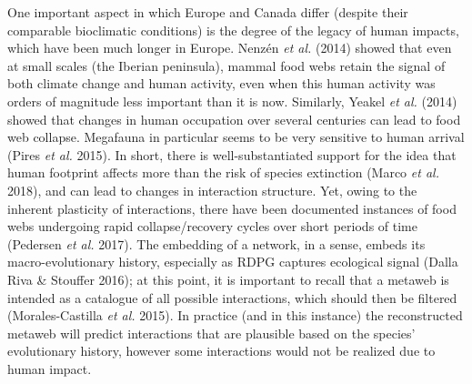 \documentclass[10pt,oneside]{article}
\begin{document}
One important aspect in which Europe and Canada differ (despite their
comparable bioclimatic conditions) is the degree of the legacy of human
impacts, which have been much longer in Europe. Nenzén \emph{et al.}
(2014) showed that even at small scales (the Iberian peninsula), mammal
food webs retain the signal of both climate change and human activity,
even when this human activity was orders of magnitude less important
than it is now. Similarly, Yeakel \emph{et al.} (2014) showed that
changes in human occupation over several centuries can lead to food web
collapse. Megafauna in particular seems to be very sensitive to human
arrival (Pires \emph{et al.} 2015). In short, there is
well-substantiated support for the idea that human footprint affects
more than the risk of species extinction (Marco \emph{et al.} 2018), and
can lead to changes in interaction structure. Yet, owing to the inherent
plasticity of interactions, there have been documented instances of food
webs undergoing rapid collapse/recovery cycles over short periods of
time (Pedersen \emph{et al.} 2017). The embedding of a network, in a
sense, embeds its macro-evolutionary history, especially as RDPG
captures ecological signal (Dalla Riva \& Stouffer 2016); at this point,
it is important to recall that a metaweb is intended as a catalogue of
all possible interactions, which should then be filtered
(Morales-Castilla \emph{et al.} 2015). In practice (and in this
instance) the reconstructed metaweb will predict interactions that are
plausible based on the species' evolutionary history, however some
interactions would not be realized due to human impact.
\end{document}
